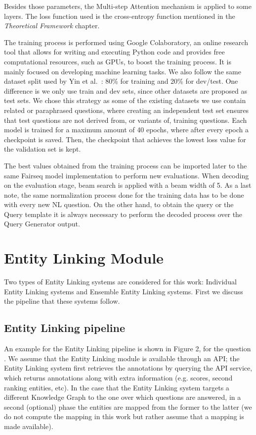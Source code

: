 Besides those parameters, the Multi-step Attention mechanism is applied to some layers. The 
loss function used is the cross-entropy function mentioned in the \textit{Theoretical 
Framework} chapter.

The training process is performed using Google Colaboratory, an online research tool that 
allows for writing and executing Python code and provides free computational resources, such 
as GPUs, to boost the training process. It is mainly focused on developing machine learning 
tasks. We also follow the same dataset split used by Yin et al.~\cite{nmt:nl-to-sparql-Yin19}: 
80\% for training and 20\% for dev/test. One difference is we only use train and dev sets, 
since other datasets are proposed as test sets. We chose this strategy as some of the 
existing datasets we use contain related or paraphrased questions, where creating an 
independent test set ensures that test questions are not derived from, or variants of, 
training questions. Each model is trained for a maximum amount of 40 epochs, where after 
every epoch a checkpoint is saved. Then, the checkpoint that achieves the lowest loss value 
for the validation set is kept.

The best values obtained from the training process can be imported later to the same Fairseq 
model implementation to perform new evaluations. When decoding on the evaluation stage, beam 
search is applied with a beam width of 5. As a last note, the same normalization process done 
for the training data has to be done with every new NL question. On the other hand, to obtain 
the \SPARQL{} query or the Query template it is always necessary to perform the decoded process 
over the Query Generator output.

\section{Entity Linking Module}
\label{cap3:system/entLinModule}
Two types of Entity Linking systems are considered for this work: Individual Entity Linking 
systems and Ensemble Entity Linking systems. First we discuss the pipeline that these systems 
follow.

\subsection{Entity Linking pipeline}
\label{cap3:system/entLinModule/pipeline}
An example for the Entity Linking pipeline is shown in Figure 2, for the question . We assume that the Entity Linking module is available through an 
API; the Entity Linking system first retrieves the annotations by querying the API service, 
which returns annotations along with extra information (e.g. scores, second ranking entities, 
etc). In the case that the Entity Linking system targets a different Knowledge Graph to the one 
over which questions are answered, in a second (optional) phase the entities are mapped from 
the former to the latter (we do not compute the mapping in this work but rather assume that a 
mapping is made available).

